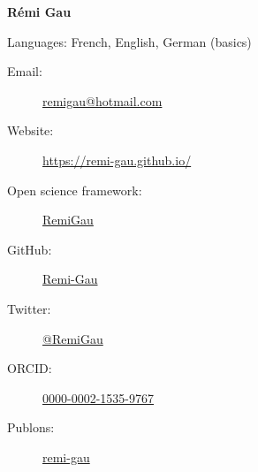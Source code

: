 \documentclass[a4paper,12pt,oneside]{letter}
\date{2021-04-10}
\begin{document}
\textbf{{\LARGE Rémi Gau}}

Languages: French, English, German (basics)

\doubleline

\begin{minipage}{.49\textwidth}
\begin{description}
    \item[Email:] \href{mailto:remi\textunderscore gau@hotmail.com}{remi\textunderscore gau@hotmail.com}
    \item[Website:] \href{https://remi-gau.github.io/}{https://remi-gau.github.io/}
    \item[Open science framework:] \href{https://osf.io/uamsk}{Remi\textunderscore Gau} 
    \newline
 \end{description}
\end{minipage}
\begin{minipage}{.49\textwidth}
\begin{description}
    \item[GitHub:] \href{https://github.com/Remi-Gau}{Remi-Gau}
    \item[Twitter:] \href{http://www.twitter.com/RemiGau}{@RemiGau}
    \item[ORCID:] \href{https://orcid.org/0000-0002-1535-9767}{0000-0002-1535-9767}
    \item[Publons:] \href{http://publons.com/author/1205193/remi-gau#profile}{remi-gau}
 \end{description}
\end{minipage}
\vspace{10pt}

\doubleline
\end{document}
